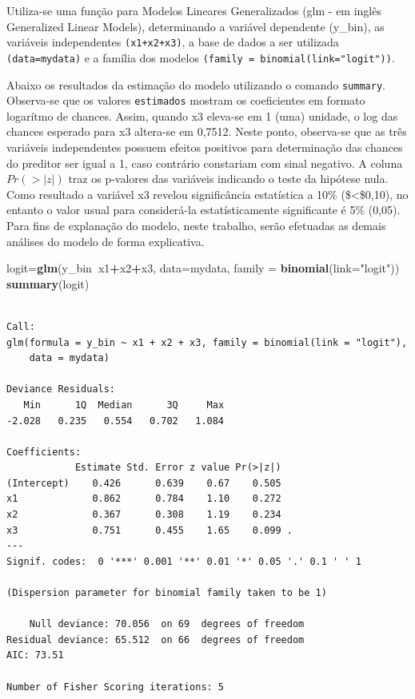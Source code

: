 \documentclass[12pt,brazil,oneside]{book}
\newenvironment{Shaded}{\begin{snugshade}}{\end{snugshade}}
\newcommand{\DataTypeTok}[1]{\textcolor[rgb]{0.13,0.29,0.53}{#1}}
\newcommand{\KeywordTok}[1]{\textcolor[rgb]{0.13,0.29,0.53}{\textbf{#1}}}
\newcommand{\NormalTok}[1]{#1}
\newcommand{\OperatorTok}[1]{\textcolor[rgb]{0.81,0.36,0.00}{\textbf{#1}}}
\newcommand{\StringTok}[1]{\textcolor[rgb]{0.31,0.60,0.02}{#1}}
\begin{document}
Utiliza-se uma função para Modelos Lineares Generalizados (glm - em
inglês Generalized Linear Models), determinando a variável dependente
(y\_bin), as variáveis independentes \texttt{(x1+x2+x3)}, a base de
dados a ser utilizada \texttt{(data=mydata)} e a família dos modelos
\texttt{(family\ =\ binomial(link="logit"))}.

Abaixo os resultados da estimação do modelo utilizando o comando
\texttt{summary}. Observa-se que os valores \texttt{estimados} mostram
os coeficientes em formato logarítmo de chances. Assim, quando x3
eleva-se em 1 (uma) unidade, o log das chances esperado para x3
altera-se em 0,7512. Neste ponto, observa-se que as três variáveis
independentes possuem efeitos positivos para determinação das chances do
preditor ser igual a 1, caso contrário constariam com sinal negativo. A
coluna \(Pr(>|z|)\) traz os p-valores das variáveis indicando o teste da
hipótese nula. Como resultado a variável x3 revelou significância
estatística a 10\% (\$\textless{}\$0,10), no entanto o valor usual para
considerá-la estatísticamente significante é 5\% (0,05). Para fins de
explanação do modelo, neste trabalho, serão efetuadas as demais análises
do modelo de forma explicativa.

\begin{Shaded}
\begin{Highlighting}[]
\NormalTok{logit=}\KeywordTok{glm}\NormalTok{(y_bin}\OperatorTok{~}\NormalTok{x1}\OperatorTok{+}\NormalTok{x2}\OperatorTok{+}\NormalTok{x3, }\DataTypeTok{data=}\NormalTok{mydata, }\DataTypeTok{family =} \KeywordTok{binomial}\NormalTok{(}\DataTypeTok{link=}\StringTok{"logit"}\NormalTok{))}
\KeywordTok{summary}\NormalTok{(logit)}
\end{Highlighting}
\end{Shaded}

\begin{verbatim}

Call:
glm(formula = y_bin ~ x1 + x2 + x3, family = binomial(link = "logit"), 
    data = mydata)

Deviance Residuals: 
   Min      1Q  Median      3Q     Max  
-2.028   0.235   0.554   0.702   1.084  

Coefficients:
            Estimate Std. Error z value Pr(>|z|)  
(Intercept)    0.426      0.639    0.67    0.505  
x1             0.862      0.784    1.10    0.272  
x2             0.367      0.308    1.19    0.234  
x3             0.751      0.455    1.65    0.099 .
---
Signif. codes:  0 '***' 0.001 '**' 0.01 '*' 0.05 '.' 0.1 ' ' 1

(Dispersion parameter for binomial family taken to be 1)

    Null deviance: 70.056  on 69  degrees of freedom
Residual deviance: 65.512  on 66  degrees of freedom
AIC: 73.51

Number of Fisher Scoring iterations: 5
\end{verbatim}
\end{document}

